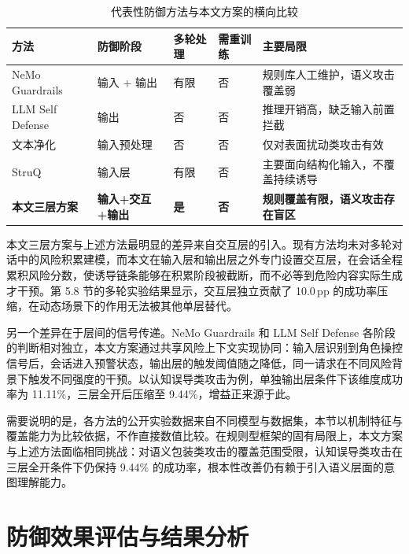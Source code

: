 \begin{table}[H]
\centering
\footnotesize
\setlength{\tabcolsep}{2pt}
\renewcommand{\arraystretch}{1.1}
\caption{代表性防御方法与本文方案的横向比较}
\label{tab:defense-comparison}
\begin{tabular}{p{}p{}>{\centering\arraybackslash}p{}>{\centering\arraybackslash}p{}p{}}
\toprule
\textbf{方法} & \textbf{防御阶段} & \textbf{多轮处理} & \textbf{需重训练} & \textbf{主要局限} \\
\midrule
NeMo Guardrails\cite{rebedea2023nemo}              & 输入 + 输出   & 有限 & 否 & 规则库人工维护，语义攻击覆盖弱 \\
LLM Self Defense\cite{phute2024llmselfdefense}     & 输出          & 否   & 否 & 推理开销高，缺乏输入前置拦截 \\
文本净化\cite{li2023textpurification}              & 输入预处理    & 否   & 否 & 仅对表面扰动类攻击有效 \\
StruQ\cite{chen2024struq} & 输入层        & 有限 & 否 & 主要面向结构化输入，不覆盖持续诱导 \\
\textbf{本文三层方案} & \textbf{输入+交互+输出} & \textbf{是} & \textbf{否} & \textbf{规则覆盖有限，语义攻击存在盲区} \\
\bottomrule
\end{tabular}
\end{table}

本文三层方案与上述方法最明显的差异来自交互层的引入。现有方法均未对多轮对话中的风险积累建模，而本文在输入层和输出层之外专门设置交互层，在会话全程累积风险分数，使诱导链条能够在积累阶段被截断，而不必等到危险内容实际生成才干预。第 5.8 节的多轮实验结果显示，交互层独立贡献了 10.0\,pp 的成功率压缩，在动态场景下的作用无法被其他单层替代。

另一个差异在于层间的信号传递。NeMo Guardrails 和 LLM Self Defense 各阶段的判断相对独立，本文方案通过共享风险上下文实现协同：输入层识别到角色操控信号后，会话进入预警状态，输出层的触发阈值随之降低，同一请求在不同风险背景下触发不同强度的干预。以认知误导类攻击为例，单独输出层条件下该维度成功率为 11.11\%，三层全开后压缩至 9.44\%，增益正来源于此。

需要说明的是，各方法的公开实验数据来自不同模型与数据集，本节以机制特征与覆盖能力为比较依据，不作直接数值比较。在规则型框架的固有局限上，本文方案与上述方法面临相同挑战：对语义包装类攻击的覆盖范围受限，认知误导类攻击在三层全开条件下仍保持 9.44\% 的成功率，根本性改善仍有赖于引入语义层面的意图理解能力。

\section{防御效果评估与结果分析}

